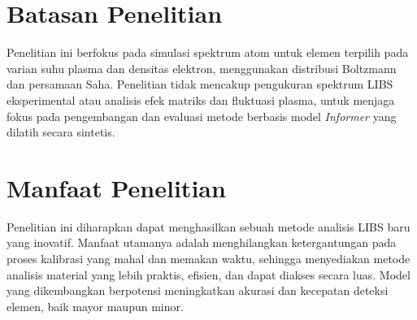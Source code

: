 \section{Batasan Penelitian}
Penelitian ini berfokus pada simulasi spektrum atom untuk elemen terpilih pada varian suhu plasma dan densitas elektron, menggunakan distribusi Boltzmann dan persamaan Saha. Penelitian tidak mencakup pengukuran spektrum LIBS eksperimental atau analisis efek matriks dan fluktuasi plasma, untuk menjaga fokus pada pengembangan dan evaluasi metode berbasis model \textit{Informer} yang dilatih secara sintetis.

\section{Manfaat Penelitian}
Penelitian ini diharapkan dapat menghasilkan sebuah metode analisis LIBS baru yang inovatif. Manfaat utamanya adalah menghilangkan ketergantungan pada proses kalibrasi yang mahal dan memakan waktu, sehingga menyediakan metode analisis material yang lebih praktis, efisien, dan dapat diakses secara luas. Model yang dikembangkan berpotensi meningkatkan akurasi dan kecepatan deteksi elemen, baik mayor maupun minor.

